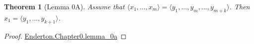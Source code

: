 \documentclass{article}
\newtheorem{theorem}{Theorem}
\begin{document}
\begin{theorem}[Lemma 0A]

Assume that $\langle x_1, \ldots, x_m \rangle = \langle y_1, \ldots, y_m, \ldots, y_{m+k} \rangle$.
Then $x_1 = \langle y_1, \ldots, y_{k+1} \rangle$.

\end{theorem}

\begin{proof}

\href{Chapter0.lean}{Enderton.Chapter0.lemma\_0a}

\end{proof}
\end{document}

